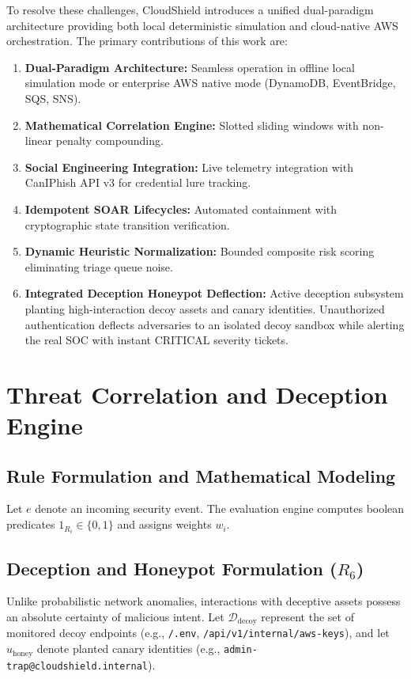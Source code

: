 \documentclass[conference]{IEEEtran}
\begin{document}
To resolve these challenges, CloudShield introduces a unified dual-paradigm architecture providing both local deterministic simulation and cloud-native AWS orchestration. The primary contributions of this work are:
\begin{enumerate}
    \item \textbf{Dual-Paradigm Architecture:} Seamless operation in offline local simulation mode or enterprise AWS native mode (DynamoDB, EventBridge, SQS, SNS).
    \item \textbf{Mathematical Correlation Engine:} Slotted sliding windows with non-linear penalty compounding.
    \item \textbf{Social Engineering Integration:} Live telemetry integration with CanIPhish API v3 for credential lure tracking.
    \item \textbf{Idempotent SOAR Lifecycles:} Automated containment with cryptographic state transition verification.
    \item \textbf{Dynamic Heuristic Normalization:} Bounded composite risk scoring eliminating triage queue noise.
    \item \textbf{Integrated Deception Honeypot Deflection:} Active deception subsystem planting high-interaction decoy assets and canary identities. Unauthorized authentication deflects adversaries to an isolated decoy sandbox while alerting the real SOC with instant CRITICAL severity tickets.
\end{enumerate}

\section{Threat Correlation and Deception Engine}

\subsection{Rule Formulation and Mathematical Modeling}
Let $e$ denote an incoming security event. The evaluation engine computes boolean predicates $1_{R_i} \in \{0, 1\}$ and assigns weights $w_i$.

\subsection{Deception and Honeypot Formulation ($R_6$)}
Unlike probabilistic network anomalies, interactions with deceptive assets possess an absolute certainty of malicious intent. Let $\mathcal{D}_{\text{decoy}}$ represent the set of monitored decoy endpoints (e.g., \texttt{/.env}, \texttt{/api/v1/internal/aws-keys}), and let $u_{\text{honey}}$ denote planted canary identities (e.g., \texttt{admin-trap@cloudshield.internal}).
\end{document}
